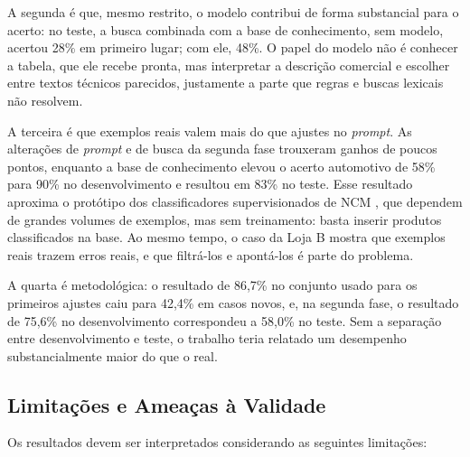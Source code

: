 A segunda é que, mesmo restrito, o modelo contribui de forma substancial para o acerto: no teste, a busca combinada com a base de conhecimento, sem modelo, acertou 28\% em primeiro lugar; com ele, 48\%. O papel do modelo não é conhecer a tabela, que ele recebe pronta, mas interpretar a descrição comercial e escolher entre textos técnicos parecidos, justamente a parte que regras e buscas lexicais não resolvem.

A terceira é que exemplos reais valem mais do que ajustes no \textit{prompt}. As alterações de \textit{prompt} e de busca da segunda fase trouxeram ganhos de poucos pontos, enquanto a base de conhecimento elevou o acerto automotivo de 58\% para 90\% no desenvolvimento e resultou em 83\% no teste. Esse resultado aproxima o protótipo dos classificadores supervisionados de NCM \cite{batista2018ncm,pinheiro2022ncm}, que dependem de grandes volumes de exemplos, mas sem treinamento: basta inserir produtos classificados na base. Ao mesmo tempo, o caso da Loja B mostra que exemplos reais trazem erros reais, e que filtrá-los e apontá-los é parte do problema.

A quarta é metodológica: o resultado de 86,7\% no conjunto usado para os primeiros ajustes caiu para 42,4\% em casos novos, e, na segunda fase, o resultado de 75,6\% no desenvolvimento correspondeu a 58,0\% no teste. Sem a separação entre desenvolvimento e teste, o trabalho teria relatado um desempenho substancialmente maior do que o real.

\subsection{Limitações e Ameaças à Validade}

Os resultados devem ser interpretados considerando as seguintes limitações:


